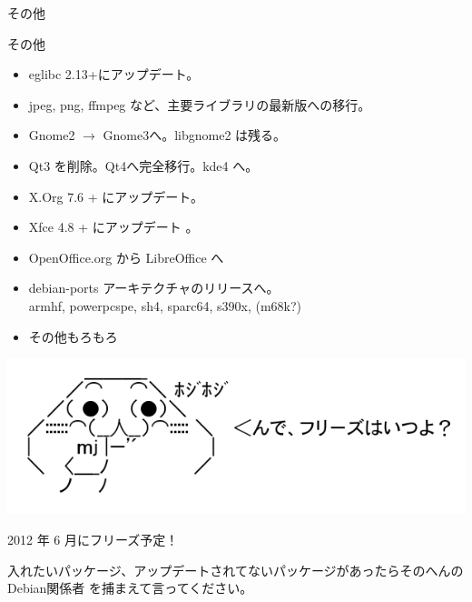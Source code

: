 \begin{frame}
\begin{center}
\LARGE{その他}
\end{center}
\end{frame}

\begin{frame}{その他}
\begin{itemize}[<+->]
 \item eglibc 2.13+にアップデート。
 \item jpeg, png, ffmpeg など、主要ライブラリの最新版への移行。
 \item Gnome2 $\rightarrow$ Gnome3へ。libgnome2 は残る。
 \item Qt3 を削除。Qt4へ完全移行。kde4 へ。
 \item X.Org 7.6 + にアップデート。
 \item Xfce 4.8 + にアップデート 。
 \item OpenOffice.org から LibreOffice へ
 \item debian-ports アーキテクチャのリリースへ。\\
       armhf, powerpcspe, sh4, sparc64, s390x, (m68k?)
 \item その他もろもろ
 \end{itemize}
\end{frame}

\begin{frame}[containsverbatim]

\begin{center}

\includegraphics[width=1.1\hsize]{image201111/yaruo-freeze.png}
\end{center}
\end{frame}


\begin{frame}
\begin{center}
\LARGE{2012 年 6 月にフリーズ予定！}\\\pause

\LARGE{入れたいパッケージ、アップデートされてないパッケージがあったらそのへんのDebian関係者
を捕まえて言ってください。}
\end{center}
\end{frame}

